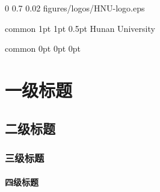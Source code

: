 \documentclass[
    report,     %
    oneside,    %
    UTF8,       %
    zihao=-4    %
]{config} %
\begin{document}


\imageWatermark %
    {0} %
    {0.7} %
    {0.02} %
    {figures/logos/HNU-logo.eps} %


\Header
    {common} %
    {1pt} %
    {1pt} %
    {0.5pt} %
    {Hunan University} %
    {} %
    {\currentChapterInfo} %


\Footer
    {common} %
    {0pt} %
    {0pt} %
    {0pt} %
    {} %
    {\thepage} %
    {} %


\SetArabicPageNumber{} %


\chapter{一级标题}

\section{二级标题}

\subsection{三级标题}

\subsubsection{四级标题}
\end{document}
